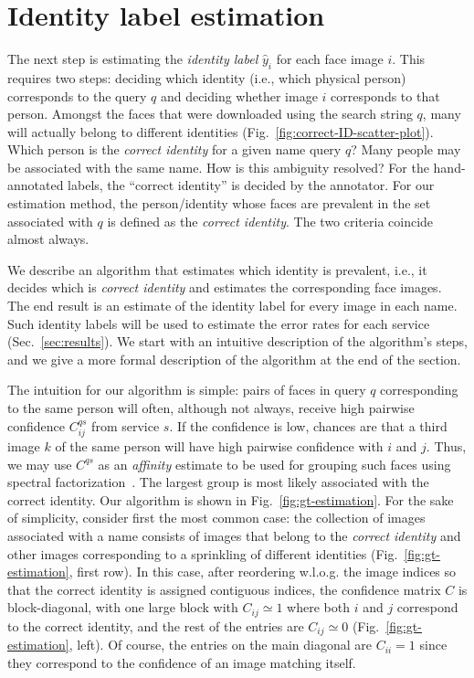 \documentclass[10pt,twocolumn,letterpaper]{article}
\begin{document}
\section{Identity label estimation}
\label{sec:gt_estimation}

The next step is estimating the {\em identity label} $\hat{y}_i$ for each face image $i$. This requires two steps: deciding which identity (i.e., which physical person) corresponds to the query $q$ and deciding whether image $i$ corresponds to that person. Amongst the faces that were downloaded using the search string $q$, many will actually belong to different identities (Fig.~\ref{fig:correct-ID-scatter-plot}). Which person is the {\em correct identity} for a given name query $q$? Many people may be associated with the same name. How is this ambiguity resolved? For the hand-annotated labels, the ``correct identity'' is decided by the annotator. For our estimation method, the person/identity whose faces are prevalent in the set associated with $q$ is defined as the {\em correct identity}. The two criteria coincide almost always.

We describe an algorithm that estimates which identity is prevalent, i.e., it decides which is {\em correct identity} and estimates the corresponding face images. The end result is an estimate of the identity label for every image in each name. Such identity labels will be used to estimate the error rates for each service (Sec.~\ref{sec:results}). We start with an intuitive description of the algorithm's steps, and we give a more formal description of the algorithm at the end of the section.

The intuition for our algorithm is simple: pairs of faces in query $q$ corresponding to the same person will often, although not always, receive high pairwise confidence $C_{ij}^{qs}$ from service $s$. If the confidence is low, chances are that a third image $k$ of the same person will have high pairwise confidence with $i$ and $j$. Thus, we may use $C^{qs}$ as an {\em affinity} estimate to be used for grouping such faces using spectral factorization~\cite{shi1997normalized}. The largest group is most likely associated with the correct identity. Our algorithm is shown in Fig.~\ref{fig:gt-estimation}. For the sake of simplicity, consider first the most common case: the collection of images associated with a name consists of images that belong to the {\em correct identity} and other images corresponding to a sprinkling of different identities (Fig.~\ref{fig:gt-estimation}, first row). In this case, after reordering w.l.o.g. the image indices so that the correct identity is assigned contiguous indices, the confidence matrix $C$ is block-diagonal, with one large block with $C_{ij}\simeq 1$ where both $i$ and $j$ correspond to the correct identity, and the rest of the entries are $C_{ij}\simeq 0$ (Fig.~\ref{fig:gt-estimation}, left). Of course, the entries on the main diagonal are $C_{ii}=1$ since they correspond to the confidence of an image matching itself. 
\end{document}
